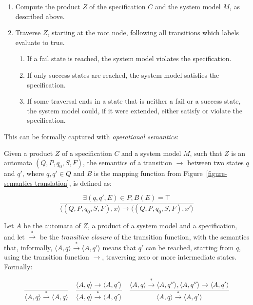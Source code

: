 \begin{enumerate}
  \item Compute the product $Z$ of the specification $C$ and the system model
    $M$, as described above.

  \item Traverse $Z$, starting at the root node, following all transitions
    which labels evaluate to true.

    \begin{enumerate}
      \item If a fail state is reached, the system model violates the
        specification.
      \item If only success states are reached, the system model satisfies the
        specification.
      \item If some traversal ends in a state that is neither a fail or a
        success state, the system model could, if it were extended, either
        satisfy or violate the specification.
    \end{enumerate}
\end{enumerate}

This can be formally captured with \textit{operational semantics}:


\begin{mydef}
Given a product $Z$ of a specification $C$ and a system model $M$, such that
$Z$ is an automata $(Q, P, q_0, S, F)$, the semantics of a transition
$\rightarrow$ between two states $q$ and $q'$, where $q,q' \in Q$ and
\textit{B} is the mapping function from
Figure~\ref{figure-semantics-translation}, is defined as:

\medskip
\[
  \frac{\exists (q, q', E) \in P, \textit{B}(E) = \top}
  {\langle(Q, P, q_0, S, F), x\rangle \rightarrow \langle(Q, P, q_0, S, F), x'\rangle}
\]
\medskip
\end{mydef}

\begin{mydef}
Let $A$ be the automata of $Z$, a product of a system model and a
specification, and let $\xrightarrow*$ be the \textit{transitive closure} of
the transition function, with the semantics that, informally, $\langle A,
q\rangle \xrightarrow* \langle A, q'\rangle$ means that $q'$ can be reached,
starting from $q$, using the transition function $\rightarrow$, traversing zero
or more intermediate states. Formally:

\medskip
\[
  \frac{}
  {\langle A, q\rangle \xrightarrow* \langle A, q\rangle}
  \quad
  \frac{\langle A, q\rangle \rightarrow \langle A, q'\rangle}
  {\langle A, q\rangle \xrightarrow* \langle A, q'\rangle}
  \quad
  \frac{\langle A, q\rangle \xrightarrow* \langle A, q''\rangle, \langle A, q''\rangle \rightarrow \langle A, q'\rangle}
  {\langle A, q\rangle \xrightarrow* \langle A, q'\rangle}
\]
\medskip
\end{mydef}

